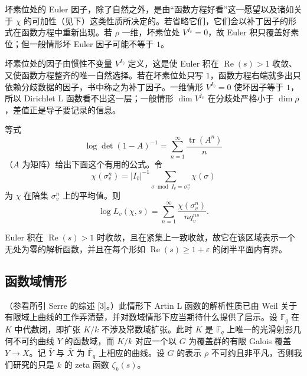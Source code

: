 坏素位处的 Euler 因子，除了自然之外，是由“函数方程好看”这一愿望以及诸如关于 $\chi$ 的可加性（见下）这类性质所决定的。若省略它们，它们会以补丁因子的形式在函数方程中重新出现。若 $\rho$ 一维，坏素位处 $V^{I_{\bar v}}=0$，故 Euler 积只覆盖好素位；但一般情形坏 Euler 因子可能不等于 $1$。

\begin{annote}
坏素位处的因子由惯性不变量 $V^{I_{\bar v}}$ 定义，这是使 Euler 积在 $\operatorname{Re}(s)>1$ 收敛、又使函数方程整齐的唯一自然选择。若在坏素位处只写 $1$，函数方程右端就多出只依赖分歧数据的因子，书中称之为补丁因子。一维情形 $V^{I_{\bar v}}=0$ 使坏因子等于 $1$，所以 Dirichlet L 函数看不出这一层；一般情形 $\dim V^{I_{\bar v}}$ 在分歧处严格小于 $\dim\rho$，差值正是导子要记录的信息。
\par\vspace{0.15em}{\raggedleft 【来源：Tate《Local constants》，Durham 会议录（A）；Serre《Zeta and L functions》，Schilling 编（A）】\par}
\end{annote}

等式
\begin{equation}\tag{3.3}\label{c4:eq:3.3}
\log\det(1-A)^{-1}=\sum_{n=1}^{\infty}\frac{\operatorname{tr}(A^{n})}{n}
\end{equation}
（$A$ 为矩阵）给出下面这个有用的公式。令
\begin{equation}\tag{3.4}\label{c4:eq:3.4}
\chi(\sigma_v^{n})=|I_{\bar v}|^{-1}\sum_{\sigma\bmod I_{\bar v}=\sigma_v^{n}}\chi(\sigma)
\end{equation}
为 $\chi$ 在陪集 $\sigma_v^{n}$ 上的平均值。则
\begin{equation}\tag{3.5}\label{c4:eq:3.5}
\log L_v(\chi,s)=\sum_{n=1}^{\infty}\frac{\chi(\sigma_v^{n})}{nq_v^{ns}} .
\end{equation}

Euler 积在 $\operatorname{Re}(s)>1$ 时收敛，且在紧集上一致收敛，故它在该区域表示一个无处为零的解析函数，并且在每个形如 $\operatorname{Re}(s)\ge1+\varepsilon$ 的闭半平面内有界。

\subsection{函数域情形}\label{c4:sec:3.3}

（参看所引 Serre 的综述 [3]。）此情形下 Artin L 函数的解析性质已由 Weil 关于有限域上曲线的工作弄清楚，并对数域情形下应当期待什么提供了启示。设 $\mathbb{F}_q$ 在 $K$ 中代数闭，即扩张 $K/k$ 不涉及常数域扩张。此时 $K$ 是 $\mathbb{F}_q$ 上唯一的光滑射影几何不可约曲线 $Y$ 的函数域，而 $K/k$ 对应一个以 $G$ 为覆盖群的有限 Galois 覆盖 $Y\to X$。记 $\bar Y$ 与 $\bar X$ 为 $\overline{\mathbb{F}}_q$ 上相应的曲线。设 $G$ 的表示 $\rho$ 不可约且非平凡，否则我们研究的只是 $k$ 的 zeta 函数 $\zeta_k(s)$。

